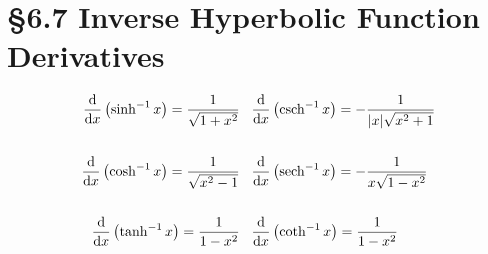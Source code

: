 \section*{\S{6.7} Inverse Hyperbolic Function Derivatives}
\begin{equation}
\begin{split}
    \doxP{\sinh^{-1} x} = \frac{1}{\sqrt{1 + x^2}} \tabspace& \doxP{\csch^{-1} x} = -\frac{1}{|x| \sqrt{x^2 + 1}} \\\\
    \doxP{\cosh^{-1} x} = \frac{1}{\sqrt{x^2 - 1}} \tabspace& \doxP{\sech^{-1} x} = -\frac{1}{x\sqrt{1 - x^2}} \\\\
    \doxP{\tanh^{-1} x} = \frac{1}{1 - x^2} \tabspace& \doxP{\coth^{-1} x} = \frac{1}{1 - x^2}
\end{split}
\end{equation}